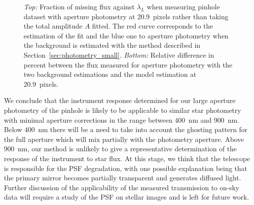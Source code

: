 \begin{figure}[h]
     \centering
     \caption{\textit{Top:} Fraction of missing flux against $\lambda_L$ when measuring \spinhole pinhole dataset with aperture photometry at \SI{20.9}{pixels} rather than taking the total amplitude $A$ fitted. The red curve corresponds to the estimation of the fit and the blue one to aperture photometry when the background is estimated with the method described in Section~\ref{sec:photometry_small}. \textit{Bottom:} Relative difference in percent between the flux measured for aperture photometry with the two background estimations and the model estimation at \SI{20.9}{pixels}.}
     \label{fig:bias_aperture}
\end{figure}

%
% 
We conclude that the instrument response determined for our large aperture photometry of the \spinhole pinhole is likely to be applicable to similar star photometry with minimal aperture corrections in the range between \SI{400}{\nano\meter} and \SI{900}{\nano\meter}. Below \SI{400}{\nano\meter} there will be a need to take into account the ghosting pattern for the full aperture which will mix partially with the photometry aperture. Above \SI{900}{\nano\meter}, our method is unlikely to give a representative determination of the response of the instrument to star flux. At this stage, we think that the \SD telescope is responsible for the PSF degradation, with one possible explanation being that the primary mirror becomes partially transparent and generates diffused light. Further discussion of the applicability of the measured transmission to on-sky data will require a study of the PSF on stellar images and is left for future work.


